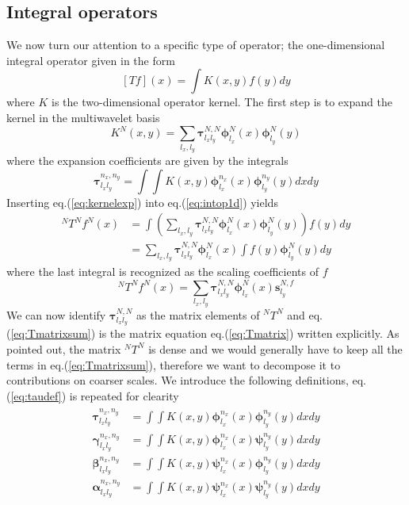 

\subsection{Integral operators}
We now turn our attention to a specific type of operator; the one-dimensional 
integral operator given in the form
\begin{equation}
	\label{eq:intop1d}
	[Tf](x) = \int K(x,y)f(y)dy
\end{equation}
where $K$ is the two-dimensional operator kernel. The first step is to expand
the kernel in the multiwavelet basis
\begin{equation}
	\label{eq:kernelexp}
	K^N(x,y) = \sum_{l_x,l_y}\boldsymbol{\tau}^{N,N}_{l_xl_y} 
	\boldsymbol{\phi}^N_{l_x}(x)\boldsymbol{\phi}^N_{l_y}(y)
\end{equation}
where the expansion coefficients are given by the integrals
\begin{equation}
	\label{eq:taudef}
	\boldsymbol{\tau}^{n_x,n_y}_{l_xl_y} = \int\int
	K(x,y)\boldsymbol{\phi}^{n_x}_{l_x}(x)\boldsymbol{\phi}^{n_y}_{l_y}(y)dxdy
\end{equation}
Inserting eq.(\ref{eq:kernelexp}) into eq.(\ref{eq:intop1d}) yields
\begin{align}
	\nonumber
	^NT^Nf^N(x) &= \int\left(\sum_{l_x,l_y} \boldsymbol{\tau}^{N,N}_{l_xl_y}
	\boldsymbol{\phi}^N_{l_x}(x)\boldsymbol{\phi}^N_{l_y}(y)\right)f(y)dy\\
	&= \sum_{l_x,l_y} \boldsymbol{\tau}^{N,N}_{l_xl_y}
	\boldsymbol{\phi}^N_{l_x}(x)\int f(y)\boldsymbol{\phi}^N_{l_y}(y)dy
\end{align}
where the last integral is recognized as the scaling coefficients of $f$
\begin{equation}
	\label{eq:Tmatrixsum}
	^NT^Nf^N(x) = \sum_{l_x,l_y} \boldsymbol{\tau}^{N,N}_{l_xl_y}
	\boldsymbol{\phi}^N_{l_x}(x)\boldsymbol{s}^{N,f}_{l_y}
\end{equation}
We can now identify $\boldsymbol{\tau}^{N,N}_{l_xl_y}$ as the matrix elements 
of $^NT^N$ and eq.(\ref{eq:Tmatrixsum}) is the matrix equation 
eq.(\ref{eq:Tmatrix}) written explicitly. As pointed out, the matrix $^NT^N$ is 
dense and we would generally have to keep all the terms in 
eq.(\ref{eq:Tmatrixsum}), therefore we want to decompose it to contributions on 
coarser scales. We introduce the following definitions, eq.(\ref{eq:taudef}) is 
repeated for clearity
\begin{align}
	\label{eq:tcbadef}
	\begin{split}
	\boldsymbol{\tau}^{n_x,n_y}_{l_xl_y} &= \int\int
	K(x,y)\boldsymbol{\phi}^{n_x}_{l_x}(x)\boldsymbol{\phi}^{n_y}_{l_y}(y)dxdy\\
	\boldsymbol{\gamma}^{n_x,n_y}_{l_xl_y} &= \int\int
	K(x,y)\boldsymbol{\phi}^{n_x}_{l_x}(x)\boldsymbol{\psi}^{n_y}_{l_y}(y)dxdy\\
	\boldsymbol{\beta}^{n_x,n_y}_{l_xl_y} &= \int\int
	K(x,y)\boldsymbol{\psi}^{n_x}_{l_x}(x)\boldsymbol{\phi}^{n_y}_{l_y}(y)dxdy\\
	\boldsymbol{\alpha}^{n_x,n_y}_{l_xl_y} &= \int\int
	K(x,y)\boldsymbol{\psi}^{n_x}_{l_x}(x)\boldsymbol{\psi}^{n_y}_{l_y}(y)dxdy
	\end{split}
\end{align}
